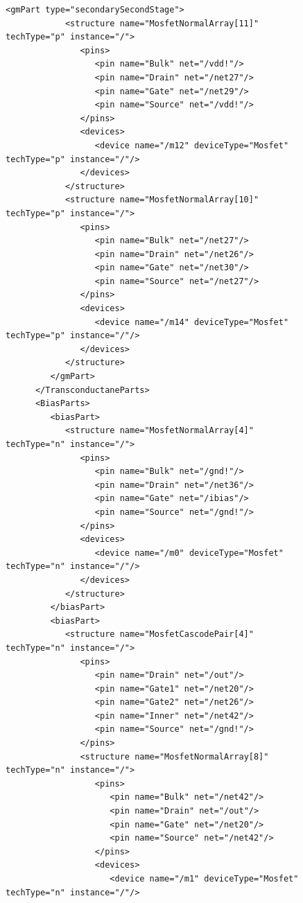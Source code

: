 \begin{figure}[H]
	\begin{lstlisting}[basicstyle=\ttfamily\scriptsize,backgroundcolor={\color{gray!30}}, escapechar=? ]
         <gmPart type="secondarySecondStage">
            <structure name="MosfetNormalArray[11]" techType="p" instance="/">
               <pins>
                  <pin name="Bulk" net="/vdd!"/>
                  <pin name="Drain" net="/net27"/>
                  <pin name="Gate" net="/net29"/>
                  <pin name="Source" net="/vdd!"/>
               </pins>
               <devices>
                  <device name="/m12" deviceType="Mosfet" techType="p" instance="/"/>
               </devices>
            </structure>
            <structure name="MosfetNormalArray[10]" techType="p" instance="/">
               <pins>
                  <pin name="Bulk" net="/net27"/>
                  <pin name="Drain" net="/net26"/>
                  <pin name="Gate" net="/net30"/>
                  <pin name="Source" net="/net27"/>
               </pins>
               <devices>
                  <device name="/m14" deviceType="Mosfet" techType="p" instance="/"/>
               </devices>
            </structure>
         </gmPart>
      </TransconductaneParts>
      <BiasParts>
         <biasPart>
            <structure name="MosfetNormalArray[4]" techType="n" instance="/">
               <pins>
                  <pin name="Bulk" net="/gnd!"/>
                  <pin name="Drain" net="/net36"/>
                  <pin name="Gate" net="/ibias"/>
                  <pin name="Source" net="/gnd!"/>
               </pins>
               <devices>
                  <device name="/m0" deviceType="Mosfet" techType="n" instance="/"/>
               </devices>
            </structure>
         </biasPart>
         <biasPart>
            <structure name="MosfetCascodePair[4]" techType="n" instance="/">
               <pins>
                  <pin name="Drain" net="/out"/>
                  <pin name="Gate1" net="/net20"/>
                  <pin name="Gate2" net="/net26"/>
                  <pin name="Inner" net="/net42"/>
                  <pin name="Source" net="/gnd!"/>
               </pins>
               <structure name="MosfetNormalArray[8]" techType="n" instance="/">
                  <pins>
                     <pin name="Bulk" net="/net42"/>
                     <pin name="Drain" net="/out"/>
                     <pin name="Gate" net="/net20"/>
                     <pin name="Source" net="/net42"/>
                  </pins>
                  <devices>
                     <device name="/m1" deviceType="Mosfet" techType="n" instance="/"/>

\end{lstlisting}
\end{figure}
